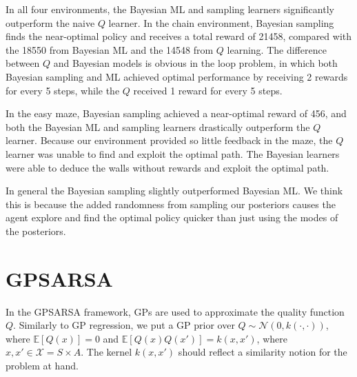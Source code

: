 \documentclass[10pt, twocolumn, twoside]{article}
\begin{document}
In all four environments, the Bayesian ML and sampling learners significantly outperform the naive
$Q$ learner. In the chain environment, Bayesian sampling finds the near-optimal policy and
receives a total reward of 21458, compared with the 18550 from Bayesian ML and the 14548 from $Q$ learning.
The difference between $Q$ and Bayesian models is obvious in the loop problem, in which both Bayesian
sampling and ML achieved optimal performance by receiving 2 rewards for every 5 steps, while the
$Q$ received 1 reward for every 5 steps.

In the easy maze, Bayesian sampling achieved a near-optimal reward of 456, and both the
Bayesian ML and sampling learners drastically outperform the $Q$ learner. Because our environment provided
so little feedback in the maze, the $Q$ learner was unable to find and exploit the optimal path. The Bayesian
learners were able to deduce the walls without rewards and exploit the optimal path. 

In general the Bayesian sampling slightly outperformed Bayesian ML. We think this is because the added
randomness from sampling our posteriors causes the agent explore and find the optimal policy quicker than
just using the modes of the posteriors.

\section{GPSARSA}
In the GPSARSA framework, GPs are used to approximate the quality function $Q$. Similarly to GP regression,
we put a GP prior over $Q \sim \mathcal{N}(0, k(\cdot, \cdot))$, where $\mathbb{E}[Q(x)] = 0$ and
$\mathbb{E}[Q(x)Q(x')] = k(x, x')$, where $x, x' \in \mathcal{X} = S \times A$. The kernel $k(x, x')$
should reflect a similarity notion for the problem at hand.
\end{document}
